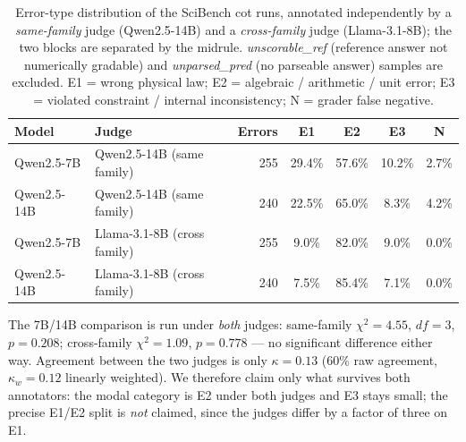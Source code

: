 \begin{table}[t]
  \centering
  \caption{Error-type distribution of the SciBench cot runs, annotated independently by
           a \emph{same-family} judge (Qwen2.5-14B) and a \emph{cross-family} judge
           (Llama-3.1-8B); the two blocks are separated by the midrule.
           \emph{unscorable\_ref} (reference answer not numerically
           gradable) and \emph{unparsed\_pred} (no parseable answer) samples are excluded.
           E1 = wrong physical law; E2 = algebraic / arithmetic / unit error;
           E3 = violated constraint / internal inconsistency; N = grader false negative.}
  \label{tab:errors}
  \small
  \begin{tabular}{@{}l l r c c c c@{}}
    \toprule
    \textbf{Model} & \textbf{Judge} & \textbf{Errors} & \textbf{E1} & \textbf{E2} &
      \textbf{E3} & \textbf{N} \\
    \midrule
    Qwen2.5-7B & Qwen2.5-14B (same family) & 255 & 29.4\% & 57.6\% & 10.2\% & 2.7\% \\
    Qwen2.5-14B & Qwen2.5-14B (same family) & 240 & 22.5\% & 65.0\% & 8.3\% & 4.2\% \\
    \midrule
    Qwen2.5-7B & Llama-3.1-8B (cross family) & 255 & 9.0\% & 82.0\% & 9.0\% & 0.0\% \\
    Qwen2.5-14B & Llama-3.1-8B (cross family) & 240 & 7.5\% & 85.4\% & 7.1\% & 0.0\% \\
    \bottomrule
  \end{tabular}
  \vspace{2pt}
  \parbox{\linewidth}{\footnotesize The 7B/14B comparison is run under \emph{both} judges: same-family $\chi^2=4.55$, $df=3$, $p=0.208$; cross-family $\chi^2=1.09$, $p=0.778$ --- no significant difference either way. Agreement between the two judges is only $\kappa=0.13$ (60\% raw agreement, $\kappa_w=0.12$ linearly weighted). We therefore claim only what survives both annotators: the modal category is E2 under both judges and E3 stays small; the precise E1/E2 split is \emph{not} claimed, since the judges differ by a factor of three on E1.}
\end{table}
